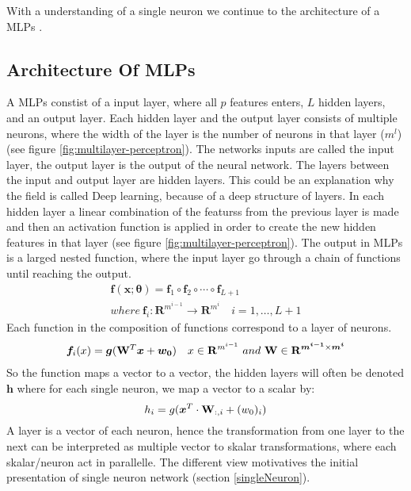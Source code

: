 With a understanding of a single neuron we continue to the architecture of a MLPs \parencite{Goodfellow-et-al-2016} \parencite{Mackay18}.


\subsection{Architecture Of MLPs}\label{architectureMLPs}
A MLPs constist of a input layer, where all $p$ features enters, $L$ hidden layers, and an output layer. Each hidden layer and the output layer consists of multiple neurons, where the width of the layer is the number of neurons in that layer ($m^l$) (see figure \ref{fig:multilayer-perceptron}). The networks inputs are called the input layer, the output layer is the output of the neural network. The layers between the input and output layer are hidden layers. This could be an explanation why the field is called Deep learning, because of a deep structure of layers. In each hidden layer a linear combination of the featurss from the previous layer is made and then an activation function is applied in order to create the new hidden features in that layer (see figure \ref{fig:multilayer-perceptron}). The output in MLPs is a larged nested function, where the input layer go through a chain of functions until reaching the output.
\begin{align}
\bm{f}(\bm{x};\bm{\theta})=\bm{f}_1 \circ \bm{f}_2 \circ \cdots \circ \bm{f}_{L+1}\\
where \ \bm{f}_i : \mathbf{R}^{m^{i-1}} \to \mathbf{R}^{m^{i}} \quad i=1,\ldots, L+1
\end{align}
Each function in the composition of functions correspond to a layer of neurons.
\begin{align}
\bm{f}_i(x)=\bm{g}(\mathbf{W}^T \bm{x} + \bm{w_0}) \quad x\in \mathbf{R}^{m^{i-1}} \ and \ \mathbf{W} \in \mathbf{R}^{\bm{m^{i-1}} \times \bm{m^{i}} }
\end{align}
So the function maps a vector to a vector, the hidden layers will often be denoted $\bm{h}$ where for each single neuron, we map a vector to a scalar by:
$$h_i=g(\bm{x}^T \cdot \mathbf{W}_{:,i} + (w_0)_{i})$$
A layer is a vector of each neuron, hence the transformation from one layer to the next can be interpreted as multiple vector to skalar transformations, where each skalar/neuron act in parallelle. The different view motivatives the initial presentation of single neuron network (section \ref{singleNeuron}).

